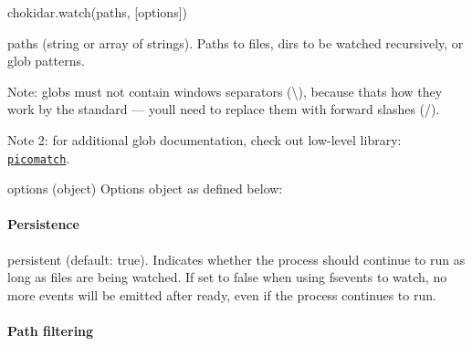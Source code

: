 {\ttfamily chokidar.\+watch(paths, \mbox{[}options\mbox{]})}


\begin{DoxyItemize}
\item {\ttfamily paths} (string or array of strings). Paths to files, dirs to be watched recursively, or glob patterns.
\begin{DoxyItemize}
\item Note\+: globs must not contain windows separators ({\ttfamily \textbackslash{}}), because that\textquotesingle{}s how they work by the standard — you\textquotesingle{}ll need to replace them with forward slashes ({\ttfamily /}).
\item Note 2\+: for additional glob documentation, check out low-\/level library\+: \href{https://github.com/micromatch/picomatch}{\tt picomatch}.
\end{DoxyItemize}
\item {\ttfamily options} (object) Options object as defined below\+:
\end{DoxyItemize}

\paragraph*{Persistence}


\begin{DoxyItemize}
\item {\ttfamily persistent} (default\+: {\ttfamily true}). Indicates whether the process should continue to run as long as files are being watched. If set to {\ttfamily false} when using {\ttfamily fsevents} to watch, no more events will be emitted after {\ttfamily ready}, even if the process continues to run.
\end{DoxyItemize}

\paragraph*{Path filtering}


